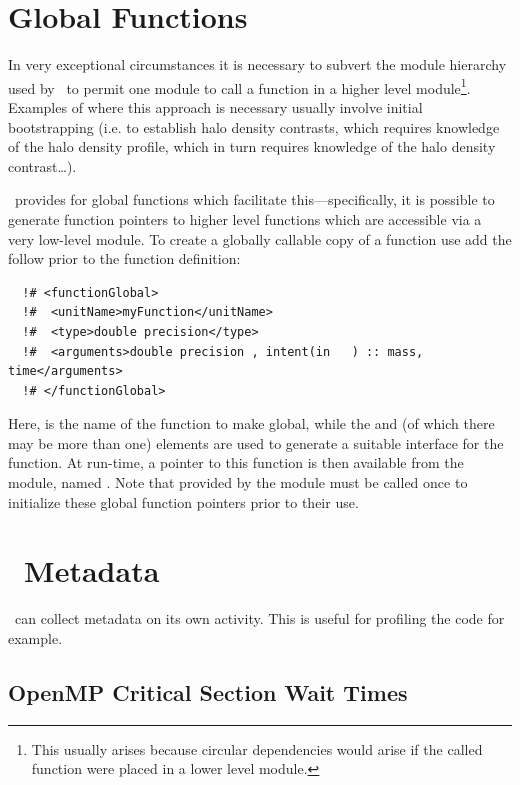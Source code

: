 \section{Global Functions}

In very exceptional circumstances it is necessary to subvert the module hierarchy used by \glc\ to permit one module to call a function in a higher level module\footnote{This usually arises because circular dependencies would arise if the called function were placed in a lower level module.}. Examples of where this approach is necessary usually involve initial bootstrapping (i.e. to establish halo density contrasts, which requires knowledge of the halo density profile, which in turn requires knowledge of the halo density contrast\ldots).

\glc\ provides for global functions which facilitate this---specifically, it is possible to generate function pointers to higher level functions which are accessible via a very low-level module. To create a globally callable copy of a function use add the follow prior to the function definition:
\begin{verbatim}
  !# <functionGlobal>
  !#  <unitName>myFunction</unitName>
  !#  <type>double precision</type>
  !#  <arguments>double precision , intent(in   ) :: mass, time</arguments>
  !# </functionGlobal>
\end{verbatim}
Here,  is the name of the function to make global, while the  and  (of which there may be more than one) elements are used to generate a suitable interface for the function. At run-time, a pointer to this function is then available from the  module, named . Note that  provided by the  module must be called once to initialize these global function pointers prior to their use.

\section{\glc\ Metadata}

\glc\ can collect metadata on its own activity. This is useful for profiling the code for example.

\subsection{OpenMP Critical Section Wait Times}


